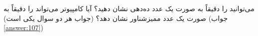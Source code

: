 \section{}
\paragraph{}\label{hint:39}
می‌توانید  را دقیقاً به صورت یک عدد ده‌دهی نشان دهید؟ آیا کامپیوتر می‌تواند  را دقیقاً به صورت یک عدد ممیزشناور نشان دهد؟ (جواب هر دو سوال یکی است) (جواب \ref{answer:107})
